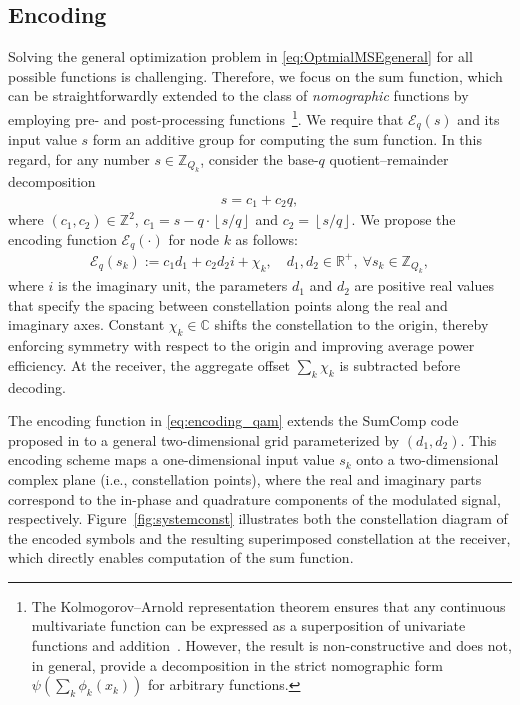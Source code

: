\documentclass[journal,12pt,onecolumn,draftclsnofoot]{IEEEtran}
\theoremstyle{definition}
\begin{document}
\subsection{Encoding}\label{sec:encoding}


Solving the general optimization problem in \eqref{eq:OptmialMSEgeneral} for all possible functions is challenging. Therefore, we focus on the sum function, which can be straightforwardly extended to the class of \emph{nomographic} functions by employing  pre- and post-processing functions~\cite{goldenbaum2014nomographic}\footnote{The Kolmogorov–Arnold representation theorem ensures that any continuous multivariate function can be expressed as a superposition of univariate functions and addition~\cite{kolmogorov1963representation}. However, the result is non-constructive and does not, in general, provide a decomposition in the strict nomographic form $\psi\!\left(\sum_k \phi_k(x_k)\right)$ for arbitrary functions.}.  We require that $\mathscr{E}_q(s)$ and its input value $s$ form an additive group for computing the sum function. In this regard, for any number $s\in \mathbb{Z}_{Q_k}$, consider the base-$q$ quotient–remainder decomposition
\begin{align}
    s = c_1+c_2q,
\end{align}
where $(c_1,c_2)\in \mathbb{Z}^{2}$, $c_1 =s - q\cdot \left\lfloor{s}/{{q}}\right\rfloor $ and $c_2 =\left\lfloor{s}/{{q}} \right\rfloor$.  We propose the encoding function $\mathscr{E}_{q}(\cdot)$ for node $k$ as follows:
\begin{align}
 \label{eq:encoding_qam}
\mathscr{E}_{q}(s_k) := c_1 d_1  +  c_2d_2 i + \chi_k,\quad d_1,d_2\in \mathbb{R}^{+}, ~\forall s_k\in \mathbb{Z}_{Q_k},
\end{align}
where $i$ is the imaginary unit, the parameters $d_1$ and $d_2$ are positive real values that specify the spacing between constellation points along the real and imaginary axes. Constant \( \chi_k \in \mathbb{C} \) shifts the constellation to the origin, thereby enforcing symmetry with respect to the origin and improving average power efficiency. At the receiver, the aggregate offset $\sum_k\chi_k$ is subtracted before decoding. 

The encoding function in \eqref{eq:encoding_qam} extends the SumComp code proposed in \cite{Razavikia2024Ring} to a general two-dimensional grid parameterized by $(d_1,d_2)$.  This encoding scheme maps a one-dimensional input value $s_k$ onto a two-dimensional complex plane (i.e., constellation points), where the real and imaginary parts correspond to the in-phase and quadrature components of the modulated signal, respectively. Figure~\ref{fig:systemconst} illustrates both the constellation diagram of the encoded symbols and the resulting superimposed constellation at the receiver, which directly enables computation of the sum function.
\end{document}
